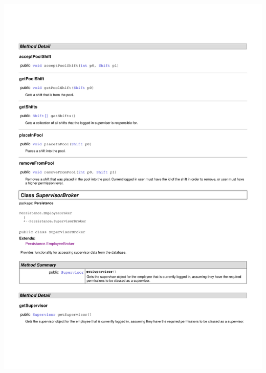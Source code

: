 \documentclass[letterpaper,12pt]{report}
\begin{document}
\includegraphics[scale=0.9,trim=20mm 30mm 25mm 25mm]{externals/PersistanceDataDictionary8.pdf}
\newpage
\end{document}
